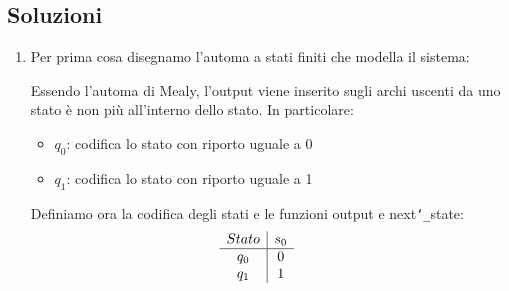 \documentclass{article}
\begin{document}
\subsection{Soluzioni}
\begin{enumerate}
    \item Per prima cosa disegnamo l’automa a stati finiti che modella il sistema:
    \begin{center}
        \end{center}
        Essendo l'automa di Mealy, l'output viene inserito sugli archi uscenti da uno stato \`e non pi\`u all'interno dello stato. In particolare:

        \begin{itemize}
            \item $q_0$: codifica lo stato con riporto uguale a 0
            \item $q_1$: codifica lo stato con riporto uguale a 1 
        \end{itemize}
        Definiamo ora la codifica degli stati e le funzioni output e next\texttt{\char`_}state:
        \begin{equation*}
        \begin{array}{c c c c c}
            \begin{array}{c|c c}
            Stato & s_0\\
            \hline
            q_0 & 0 \\
            q_1 & 1 \\
            \end{array}
            &      &
            

\end{array}
\end{equation*}
\end{enumerate}
\end{document}
